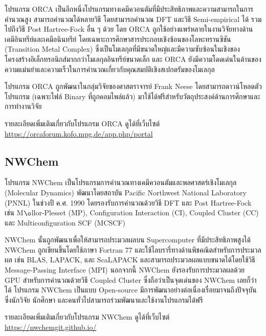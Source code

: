 โปรแกรม ORCA เป็นอีกหนึ่งโปรแกรมทางเคมีควอนตัมที่มีประสิทธิภาพและความสามารถในการคำนวณสูง\autocite{neese2012,neese2018} 
สามารถคำนวณได้หลายวิธี โดยสามารถคำนวณ DFT และวิธี Semi-empirical ได้ รวมไปถึงวิธี Post Hartree-Fock อื่น ๆ ด้วย โดย ORCA 
ถูกใช้อย่างแพร่หลายในงานวิจัยทางด้านเคมีอินทรีย์และเคมีอนินทรีย์ โดยเฉพาะการศึกษาสารประกอบเชิงซ้อนของโลหะทรานซิชัน (Transition 
Metal Complex) ซึ่งเป็นโมเลกุลที่มีขนาดใหญ่และมีความซับซ้อนในเชิงของโครงสร้างอิเล็กทรอนิกส์มากกว่าโมเลกุลอินทรีย์ขนาดเล็ก และ ORCA 
ยังมีความโดดเด่นในด้านของความแม่นยำและความเร็วในการคำนวณเกี่ยวกับคุณสมบัติเชิงสเปกตรัมของโมเลกุล

โปรแกรม ORCA ถูกพัฒนาในกลุ่มวิจัยของศาสตราจารย์ Frank Neese โดยสามารถดาวน์โหลดตัวโปรแกรม (เฉพาะไฟล์ Binary ที่ถูกคอมไพล์แล้ว)
มาใช้ได้ฟรีสำหรับวัตถุประสงค์ด้านการศึกษาและการทำงานวิจัย 

รายละเอียดเพิ่มเติมเกี่ยวกับโปรแกรม ORCA ดูได้ที่เว็บไซต์ \url{https://orcaforum.kofo.mpg.de/app.php/portal}

\subsection{NWChem}
\label{ssec:nwchem}

โปรแกรม NWChem เป็นโปรแกรมการคำนวณทางเคมีควอนตัมและพลศาสตร์เชิงโมเลกุล (Molecular Dynamics)\autocite{apra2020} 
พัฒนาโดยสถาบัน Pacific Northwest National Laboratory (PNNL) ในช่วงปี ค.ศ. 1990 โดยรองรับการคำนวณด้วยวิธี DFT และ 
Post Hartree-Fock เช่น M$\o$llor-Plesset (MP), Configuration Interaction (CI), Coupled Cluster (CC) และ
Multiconfiguration SCF (MCSCF) 

NWChem นั้นถูกพัฒนาเพื่อให้สามารถประมวลผลบน Supercomputer ที่มีประสิทธิภาพสูงได้ NWChem ถูกเขียนขึ้นโดยใช้ภาษา Fortran 77
และใช้ไลบรารี่ทางด้านพีชคณิตสำหรับการประมวลผล เช่น BLAS, LAPACK, และ ScaLAPACK และสามารถประมวลผลแบบขนาดได้โดยใช้วิธี 
Message-Passing Interface (MPI) นอกจากนี้ NWChem ยังรองรับการประมวลผลด้วย GPU สำหรับการคำนวณด้วยวิธี Coupled Cluster 
ซึ่งถือว่าเป็นจุดเด่นของ NWChem เลยก็ว่าได้ โปรแกรม NWChem เป็นแบบ Open-source มีการพัฒนาอย่างต่อเนื่องเรื่อยมาจนถึงปัจจุบัน ซึ่งนักวิจัย 
นักศึกษา และคนทั่วไปสามารถร่วมพัฒนาและใช้งานโปรแกรมได้ฟรี

รายละเอียดเพิ่มเติมเกี่ยวกับโปรแกรม NWChem ดูได้ที่เว็บไซต์ \url{https://nwchemgit.github.io/}
